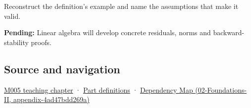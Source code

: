 Reconstruct the definition's example and name the assumptions that make it valid.

\textbf{Pending:} Linear algebra will develop concrete residuals, norms and backward-stability proofs.

\subsection{Source and navigation}\label{appendix-a7fbaf6d1b1c-source-and-navigation}

\hyperref[01-foundations-i-ch001-when-arithmetic-meets-uncertainty]{M005 teaching chapter} · \hyperref[appendix-fd090d982a15-m005---parts-77-88]{Part definitions} · \href{../02-Foundations-II/main.pdf\#nameddest=appendix-4ad47bdd269a}{Dependency Map (02-Foundations-II, appendix-4ad47bdd269a)}
